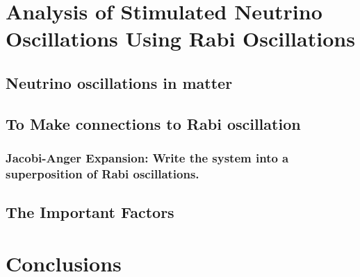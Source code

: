 \documentclass[%
preprint,
 amsmath,amssymb,
 aps,
]{revtex4-1}
\begin{document}

\section{\label{stimulated}Analysis of Stimulated Neutrino Oscillations Using Rabi Oscillations}



\subsection{Neutrino oscillations in matter}



\subsection{To Make connections to Rabi oscillation}



\subsubsection{Jacobi-Anger Expansion: Write the system into a superposition of Rabi oscillations.}
    
    




    

\subsection{The Important Factors}









\section{\label{conclusions}Conclusions}









 



\end{document}
